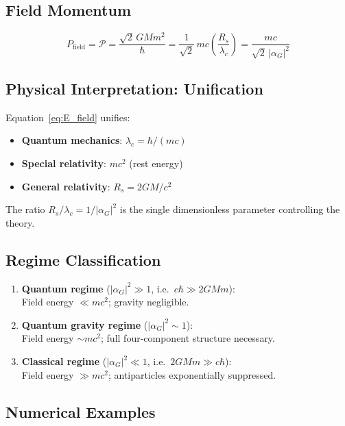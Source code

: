 \documentclass[11pt,a4paper]{article}
\theoremstyle{definition}
\theoremstyle{remark}
\begin{document}
	\subsection{Field Momentum}
	
	\begin{equation}
		\boxed{P_{\mathrm{field}} = \mathcal{P} = \frac{\sqrt{2}\,GMm^2}{\hbar} = \frac{1}{\sqrt{2}}\,mc\left(\frac{R_s}{\lambda_c}\right) = \frac{mc}{\sqrt{2}\,|\alpha_G|^2}}
		\label{eq:P_field}
	\end{equation}
	
	\subsection{Physical Interpretation: Unification}
	
	Equation~\eqref{eq:E_field} unifies:
	\begin{itemize}
		\item \textbf{Quantum mechanics}: $\lambda_c=\hbar/(mc)$
		\item \textbf{Special relativity}: $mc^2$ (rest energy)
		\item \textbf{General relativity}: $R_s=2GM/c^2$
	\end{itemize}
	The ratio $R_s/\lambda_c = 1/|\alpha_G|^2$ is the single dimensionless parameter controlling the theory.
	
	\subsection{Regime Classification}
	
	\begin{enumerate}
		\item \textbf{Quantum regime} ($|\alpha_G|^2\gg1$, i.e.\ $c\hbar\gg2GMm$):\\
		Field energy $\ll mc^2$; gravity negligible.
		\item \textbf{Quantum gravity regime} ($|\alpha_G|^2\sim1$):\\
		Field energy $\sim mc^2$; full four-component structure necessary.
		\item \textbf{Classical regime} ($|\alpha_G|^2\ll1$, i.e.\ $2GMm\gg c\hbar$):\\
		Field energy $\gg mc^2$; antiparticles exponentially suppressed.
	\end{enumerate}
	
	\subsection{Numerical Examples}
	
\end{document}
